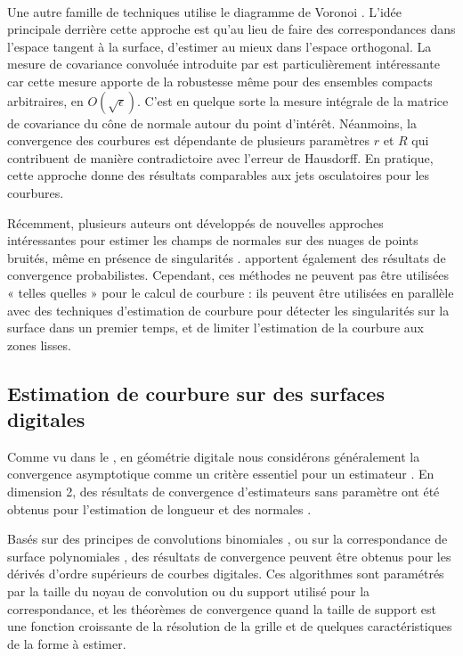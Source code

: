 \paragraph{}
%
Une autre famille de techniques utilise le diagramme de Voronoi
\cite{Alliez2007,Merigot2009,Merigot2011}. L'idée principale derrière cette
approche est qu'au lieu de faire des correspondances dans l'espace tangent à la
surface, d'estimer au mieux dans l'espace orthogonal. La mesure de covariance
convoluée introduite par  est particulièrement
intéressante car cette mesure apporte de la robustesse même pour des ensembles
compacts arbitraires, en $O(\sqrt{\epsilon})$. C'est en quelque sorte la mesure
intégrale de la matrice de covariance du cône de normale autour du point
d'intérêt. Néanmoins, la convergence des courbures est dépendante de plusieurs
paramètres $r$ et $R$ qui contribuent de manière contradictoire avec l'erreur de
Hausdorff. En pratique, cette approche donne des résultats comparables aux jets
osculatoires pour les courbures.


Récemment, plusieurs auteurs ont développés de nouvelles approches intéressantes
pour estimer les champs de normales sur des nuages de points bruités, même en
présence de singularités \cite{Li2010, Boulch2012, Zhang2013}.
 apportent également des résultats de convergence
probabilistes. Cependant, ces méthodes ne peuvent pas être utilisées « telles
quelles » pour le calcul de courbure : ils peuvent être utilisées en parallèle
avec des techniques d'estimation de courbure pour détecter les singularités sur
la surface dans un premier temps, et de limiter l'estimation de la courbure aux
zones lisses.
%
\subsection{Estimation de courbure sur des surfaces digitales}
%
Comme vu dans le , en géométrie digitale nous
considérons généralement la convergence asymptotique comme un critère essentiel
pour un estimateur \cite{Coeurjolly_ChapEstimateur}. En dimension 2, des
résultats de convergence d'estimateurs sans paramètre ont été obtenus pour
l'estimation de longueur \cite{Coeurjolly2004} et des normales
\cite{deVieilleville2007}.


Basés sur des principes de convolutions binomiales
\cite{Malgouyres2008,Esbelin2011}, ou sur la correspondance de surface
polynomiales \cite{Provot2011}, des résultats de convergence peuvent être obtenus
pour les dérivés d'ordre supérieurs de courbes digitales. Ces algorithmes sont
paramétrés par la taille du noyau de convolution ou du support utilisé
pour la correspondance, et les théorèmes de convergence  quand la taille de support est une fonction
croissante de la résolution de la grille et de quelques caractéristiques de la
forme à estimer.


